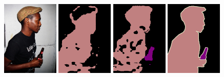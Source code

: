 \begin{figure}[tbhp!]
  {\includegraphics[width=0.24\textwidth]{figures/experiments/pascal/orgckpt/0031.jpg}}
  {\includegraphics[width=0.24\textwidth]{figures/experiments/pascal/orgckpt/0031.png}}
  {\includegraphics[width=0.24\textwidth]{figures/experiments/pascal/nonnoisybaseline/0031.png}}
  {\includegraphics[width=0.24\textwidth]{figures/experiments/pascal/gt/2007_000999.png}}
  
  

\end{figure}
